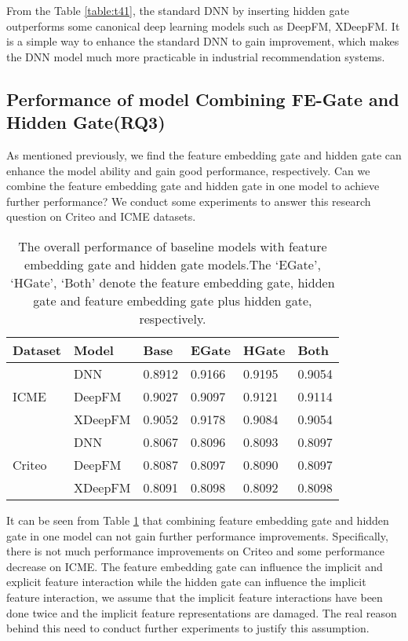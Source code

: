 \documentclass[sigconf,nonacm=true]{acmart}
\begin{document}
From the Table \ref{table:t41}, the standard DNN by inserting hidden gate outperforms some canonical deep learning models such as DeepFM, XDeepFM.
It is a simple way to enhance the standard DNN to gain improvement, 
which makes the DNN model much more practicable in industrial recommendation systems.

  
\subsection{Performance of model Combining FE-Gate and Hidden Gate(RQ3)}

As mentioned previously, we find the feature embedding gate and hidden gate can enhance the model ability and gain good performance, respectively.
Can we combine the feature embedding gate and hidden gate in one model to achieve further performance?
We conduct some experiments to answer this research question on Criteo and ICME datasets. 
  
 \begin{table}[!htbp]
  \centering
  \caption{The overall performance of baseline models with feature embedding gate and hidden gate models.The `EGate', `HGate', `Both' denote the feature embedding gate, hidden gate and feature embedding gate plus hidden gate, respectively.}
  \label{table:t5}
\begin{tabular}{llllll}
Dataset & Model & Base & EGate & HGate & Both \\ \hline
\multirow{3}{*}{ICME}
 & DNN & 0.8912 & 0.9166 & 0.9195 & 0.9054\\
 & DeepFM & 0.9027 & 0.9097 & 0.9121 & 0.9114  \\
 & XDeepFM & 0.9052 & 0.9178 & 0.9084 & 0.9054 \\ \hline
\multirow{3}{*}{Criteo} 
 & DNN & 0.8067 & 0.8096 & 0.8093 & 0.8097 \\
 & DeepFM & 0.8087 & 0.8097 & 0.8090 & 0.8097 \\
 & XDeepFM & 0.8091 & 0.8098 & 0.8092 & 0.8098 \tabularnewline \bottomrule
\end{tabular}
\end{table}

It can be seen from Table \ref{table:t5} that combining feature embedding gate and hidden gate in one model can not 
gain further performance improvements. Specifically, there is not much performance improvements on Criteo and some performance decrease on ICME.
The feature embedding gate can influence the implicit and explicit feature interaction while the hidden gate can influence the implicit feature interaction,
we assume that the implicit feature interactions have been done twice and the implicit feature representations are damaged.
The real reason behind this need to conduct further experiments to justify this assumption.
\end{document}
